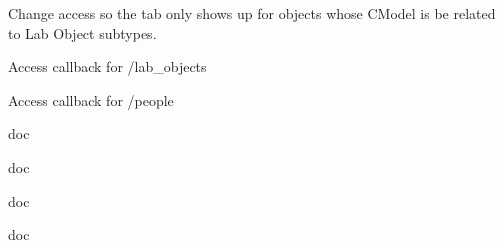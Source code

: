 
\begin{DoxyRefList}
\item[\label{todo__todo000001}%
\hypertarget{todo__todo000001}{}%
Member \hyperlink{islandora__bioinformatics__base_8module_a34856467f23719cd8eaf851f85ccf7e8}{islandora\+\_\+bioinformatics\+\_\+base\+\_\+menu} ()]Change access so the tab only shows up for objects whose C\+Model is be related to Lab Object subtypes. 

Access callback for /lab\+\_\+objects 

Access callback for /people  
\item[\label{todo__todo000004}%
\hypertarget{todo__todo000004}{}%
Member \hyperlink{islandora__bioinformatics__base_8module_a1dc5e940beb7a2b30952ce00b01d388e}{related\+\_\+islandora\+\_\+objects} (\$object, \$cmodels=null, \$relationships=null)]doc

doc

doc

doc 
\end{DoxyRefList}